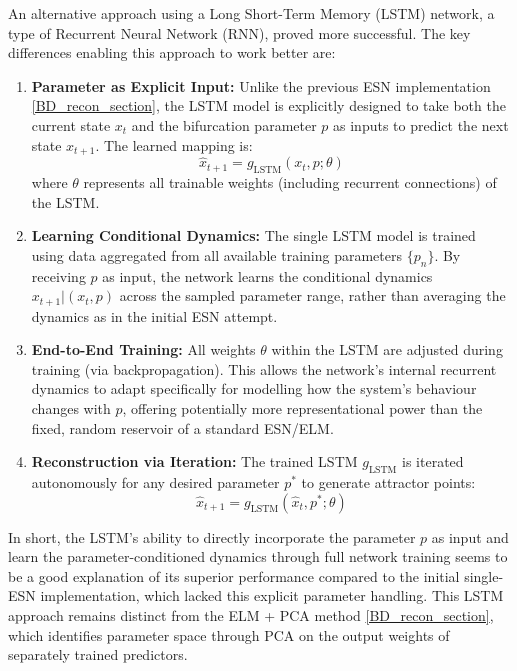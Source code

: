 \documentclass[numbered]{ivt-style/standard}
\begin{document}
An alternative approach using a Long Short-Term Memory (LSTM) network, a type of Recurrent Neural Network (RNN), proved more successful. The key differences enabling this approach to work better are:

\begin{enumerate}
    \item \textbf{Parameter as Explicit Input:} Unlike the previous ESN implementation \ref{BD_recon_section}, the LSTM model is explicitly designed to take both the current state $x_t$ and the bifurcation parameter $p$ as inputs to predict the next state $x_{t+1}$. The learned mapping is:
    \begin{equation}
        \hat{x}_{t+1} = g_{\text{LSTM}}(x_t, p; \theta)
        \label{eq:lstm_map}
    \end{equation}
    where $\theta$ represents all trainable weights (including recurrent connections) of the LSTM.

    \item \textbf{Learning Conditional Dynamics:} The single LSTM model is trained using data aggregated from all available training parameters $\{p_n\}$. By receiving $p$ as input, the network learns the conditional dynamics $x_{t+1} | (x_t, p)$ across the sampled parameter range, rather than averaging the dynamics as in the initial ESN attempt.

    \item \textbf{End-to-End Training:} All weights $\theta$ within the LSTM are adjusted during training (via backpropagation). This allows the network's internal recurrent dynamics to adapt specifically for modelling how the system's behaviour changes with $p$, offering potentially more representational power than the fixed, random reservoir of a standard ESN/ELM.

    \item \textbf{Reconstruction via Iteration:} The trained LSTM $g_{\text{LSTM}}$ is iterated autonomously for any desired parameter $p^*$ to generate attractor points:
    \begin{equation}
        \hat{x}_{t+1} = g_{\text{LSTM}}(\hat{x}_t, p^*; \theta)
    \end{equation}
\end{enumerate}


In short, the LSTM's ability to directly incorporate the parameter $p$ as input and learn the parameter-conditioned dynamics through full network training seems to be a good explanation of its superior performance compared to the initial single-ESN implementation, which lacked this explicit parameter handling. This LSTM approach remains distinct from the ELM + PCA method \ref{BD_recon_section}, which identifies parameter space through PCA on the output weights of separately trained predictors.
\end{document}
